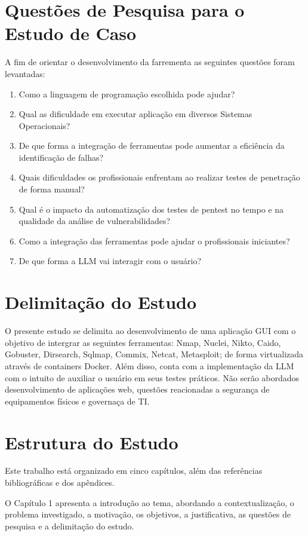 \section{Questões de Pesquisa para o Estudo de Caso}
    A fim de orientar o desenvolvimento da farrementa as seguintes questões foram levantadas:
    \begin{enumerate}
        \item Como a linguagem de programação escolhida pode ajudar?
        \item Qual as dificuldade em executar aplicação em diversos Sistemas Operacionais?
        \item De que forma a integração de ferramentas pode aumentar a eficiência da identificação de falhas?
        \item Quais dificuldades os profissionais enfrentam ao realizar testes de penetração de forma manual?
        \item Qual é o impacto da automatização dos testes de pentest no tempo e na qualidade da análise de vulnerabilidades?
        \item Como a integração das ferramentas pode ajudar o profissionais iniciantes?
        \item De que forma a LLM vai interagir com o usuário?
    \end{enumerate}
\section{Delimitação do Estudo}
    O presente estudo se delimita ao desenvolvimento de uma aplicação GUI com o objetivo de intergrar as seguintes ferramentas:
    Nmap, Nuclei, Nikto, Caido, Gobuster, Dirsearch, Sqlmap, Commix, Netcat, Metasploit; de forma virtualizada através de containers Docker. Além disso,
    conta com a implementação da LLM com o intuito de auxiliar o usuário em seus testes práticos. Não serão abordados desenvolvimento de aplicações
    web, questões reacionadas a segurança de equipamentos físicos e governaça de TI. 

\section{Estrutura do Estudo}
    Este trabalho está organizado em cinco capítulos, além das referências bibliográficas e dos apêndices.

    O Capítulo 1 apresenta a introdução ao tema, abordando a contextualização, o problema investigado, a motivação, os objetivos,
    a justificativa, as questões de pesquisa e a delimitação do estudo.

